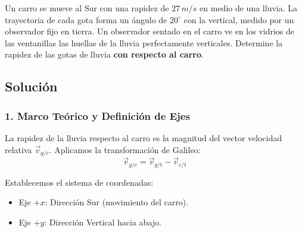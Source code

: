 \documentclass[12pt, a4paper]{article}
\begin{document}
Un carro se mueve al Sur con una rapidez de $27 \, \si{m/s}$ en medio de una lluvia. La trayectoria de cada gota forma un ángulo de $20^\circ$ con la vertical, medido por un observador fijo en tierra. Un observador sentado en el carro ve en los vidrios de las ventanillas las huellas de la lluvia perfectamente verticales. Determine la rapidez de las gotas de lluvia \textbf{con respecto al carro}.

\begin{center}
\end{center}

\subsection*{Solución}

\subsubsection*{1. Marco Teórico y Definición de Ejes}

La rapidez de la lluvia respecto al carro es la magnitud del vector velocidad relativa $\vec{v}_{g/c}$. Aplicamos la transformación de Galileo:
\begin{equation}
    \vec{v}_{g/c} = \vec{v}_{g/t} - \vec{v}_{c/t}
\end{equation}

Establecemos el sistema de coordenadas:
\begin{itemize}
    \item Eje $+x$: Dirección Sur (movimiento del carro).
    \item Eje $+y$: Dirección Vertical hacia abajo.
\end{itemize}
\end{document}
